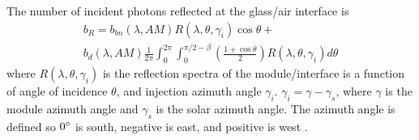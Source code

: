 \documentclass[preprint,12pt]{elsarticle}
\newcommand{\blue}[1]{{\leavevmode\color{blue}{#1}}} %
\begin{document}



% 
The number of incident photons reflected at the glass/air interface is
\begin{multline}
b_{R} =   b_{bn} (\lambda, AM)    R(\lambda, \theta, \gamma_i)  \cos \theta + \\ b_d (\lambda, AM) \frac{1}{2 \pi } \int_{0}^{2 \pi} \int_{0}^{\pi/2 - \beta} \left ( \frac{1 + \cos \theta}{2} \right ) R(\lambda, \theta, \gamma_i) d \theta
\end{multline}
where $R(\lambda, \theta, \gamma_i)$ is the reflection spectra of the module/interface is a function of 
angle of incidence $\theta$, and injection azimuth angle $\gamma_i$. 
$\gamma_i = \gamma - \gamma_s$, where $\gamma$ is the module azimuth angle and $\gamma_s$ is the solar azimuth angle.  
The azimuth angle is defined so $0 \degree$ is south,   negative is east, and positive is west \cite{Duffie:13}. 
\end{document}
